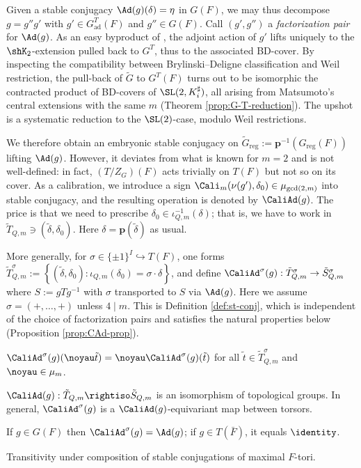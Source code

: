 \documentclass[a4paper,10pt]{article}
\begin{document}
Given a stable conjugacy $\Ad(g)(\delta) = \eta$ in $G(F)$, we may thus decompose $g = g'' g'$ with $g' \in G^T_\text{ad}(F)$ and $g'' \in G(F)$. Call $(g',g'')$ a \emph{factorization pair} for $\Ad(g)$. As an easy byproduct of \cite{BD01}, the adjoint action of $g'$ lifts uniquely to the $\shK_2$-extension pulled back to $G^T$, thus to the associated BD-cover. By inspecting the compatibility between Brylinski--Deligne classification and Weil restriction, the pull-back of $\tilde{G}$ to $G^T(F)$ turns out to be isomorphic the contracted product of BD-covers of $\SL(2, K_i^\sharp)$, all arising from Matsumoto's central extensions with the same $m$ (Theorem \ref{prop:G-T-reduction}). The upshot is a systematic reduction to the $\SL(2)$-case, modulo Weil restrictions.

We therefore obtain an embryonic stable conjugacy on $\tilde{G}_\text{reg} := \bm{p}^{-1}(G_\text{reg}(F))$ lifting $\Ad(g)$. However, it deviates from what is known for $m=2$ and is not well-defined: in fact, $(T/Z_G)(F)$ acts trivially on $T(F)$ but not so on its cover. As a calibration, we introduce a sign $\Cali_m(\nu(g'), \delta_0) \in \mu_{\text{gcd}(2,m)}$ into stable conjugacy, and the resulting operation is denoted by $\CaliAd(g)$. The price is that we need to prescribe $\delta_0 \in \iota_{Q,m}^{-1}(\delta)$; that is, we have to work in $\tilde{T}_{Q,m} \ni (\tilde{\delta}, \delta_0)$. Here $\delta = \bm{p}(\tilde{\delta})$ as usual.

More generally, for $\sigma \in \{\pm 1\}^I \hookrightarrow T(F)$, one forms $\tilde{T}^\sigma_{Q,m} := \left\{ (\tilde{\delta}, \delta_0): \iota_{Q,m}(\delta_0) = \sigma \cdot \delta \right\}$, and define $\CaliAd^\sigma(g): \tilde{T}^\sigma_{Q,m} \to \tilde{S}^\sigma_{Q,m}$ where $S := gTg^{-1}$ with $\sigma$ transported to $S$ via $\Ad(g)$. Here we assume $\sigma = (+, \ldots, +)$ unless $4 \mid m$. This is Definition \ref{def:st-conj}, which is independent of the choice of factorization pairs and satisfies the natural properties below (Proposition \ref{prop:CAd-prop}).
\begin{compactenum}[\bfseries{AD}.1.\;]
	\item $\CaliAd^\sigma(g)(\noyau\tilde{t}) = \noyau \CaliAd^\sigma(g)(\tilde{t})$ for all $\tilde{t} \in \tilde{T}^\sigma_{Q,m}$ and $\noyau \in \mu_m$.
	\item $\CaliAd(g): \tilde{T}_{Q,m} \rightiso \tilde{S}_{Q,m}$ is an isomorphism of topological groups. In general, $\CaliAd^\sigma(g)$ is a $\CaliAd(g)$-equivariant map between torsors.
	\item If $g \in G(F)$ then $\CaliAd^\sigma(g) = \Ad(g)$; if $g \in T(\bar{F})$, it equals $\identity$.
	\item Transitivity under composition of stable conjugations of maximal $F$-tori.
\end{compactenum}
\end{document}
